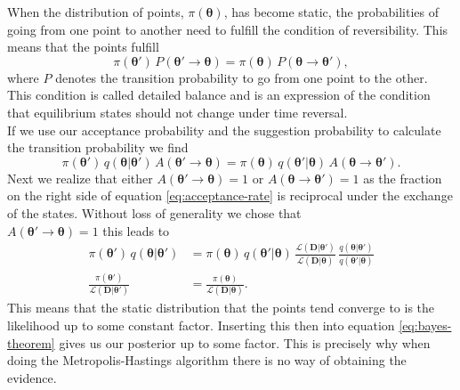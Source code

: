 \documentclass[oneside]{book}
\begin{document}
 When the distribution of points, $\pi(\boldsymbol{\theta})$, has become static, the probabilities of going from one point to another need to fulfill the condition of reversibility. This means that the points fulfill \begin{equation}
    \pi(\boldsymbol{\theta}')\, P(\boldsymbol{\theta}'\to\boldsymbol{\theta})= \pi(\boldsymbol{\theta})\,P(\boldsymbol{\theta}\to\boldsymbol{\theta}'),
 \end{equation}
 where $P$ denotes the transition probability to go from one point to the other. This condition is called detailed balance and is an expression of the condition that equilibrium states should not change under time reversal. \\
 If we use our acceptance probability and the suggestion probability to calculate the transition probability we find \begin{equation}
    \pi(\boldsymbol{\theta}')\,q(\boldsymbol{\theta}|\boldsymbol{\theta}')\,A(\boldsymbol{\theta}'\to\boldsymbol{\theta}) = \pi(\boldsymbol{\theta})\,q(\boldsymbol{\theta}'|\boldsymbol{\theta})\,A(\boldsymbol{\theta}\to\boldsymbol{\theta}').
 \end{equation}
 Next we realize that either $A(\boldsymbol{\theta}'\to\boldsymbol{\theta})=1$ or $A(\boldsymbol{\theta}\to\boldsymbol{\theta}')=1$  as the fraction on the right side 
 of equation \ref{eq:acceptance-rate} is reciprocal under the exchange of the states. Without loss of generality we chose that \\$A(\boldsymbol{\theta}'\to\boldsymbol{\theta})=1$ this leads to 
 \begin{align}
    \pi(\boldsymbol{\theta}')\,q(\boldsymbol{\theta}|\boldsymbol{\theta}') &= \pi(\boldsymbol{\theta})\,q(\boldsymbol{\theta}'|\boldsymbol{\theta})\,\frac{\mathcal{L}(\boldsymbol{D}|\boldsymbol{\theta}')}{\mathcal{L}(\boldsymbol{D}|\boldsymbol{\theta})}\,\frac{q(\boldsymbol{\theta}|\boldsymbol{\theta}')}{q(\boldsymbol{\theta}'|\boldsymbol{\theta})} \nonumber \\
    \frac{\pi(\boldsymbol{\theta}')}{\mathcal{L}(\boldsymbol{D}|\boldsymbol{\theta}')} &= \frac{\pi(\boldsymbol{\theta})}{\mathcal{L}(\boldsymbol{D}|\boldsymbol{\theta})}.
 \end{align}
 This means that the static distribution that the points tend converge to is the likelihood up to some constant factor. Inserting this then into equation \ref{eq:bayes-theorem} gives us our posterior up to some factor. This is precisely why when doing the Metropolis-Hastings algorithm there is no way of obtaining the evidence.\\
\end{document}
